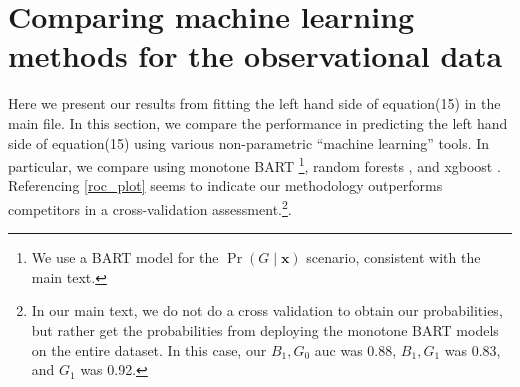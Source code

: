 \documentclass[aoas,preprint, 11pt, dvipsnames, table, x11name]{imsart}
\renewcommand{\bm}[1]{\mathbf{#1}}
\theoremstyle{remark}
\begin{document}
	\newpage
	\section{Comparing machine learning methods for the observational data}\label{machine_append}
	Here we present our results from fitting the left hand side of equation(15) in the main file.
	In this section, we compare the performance in predicting the left hand side of equation(15) using various non-parametric ``machine learning'' tools.  In particular, we compare using monotone BART \footnote{We use a BART \citep{bart} model for the $\Pr(G\mid \bm{x})$ scenario, consistent with the main text.}, random forests \citep{rf}, and xgboost \citep{boost}. Referencing \autoref{roc_plot} seems to indicate our methodology outperforms competitors in a cross-validation assessment.\footnote{In our main text, we do not do a cross validation to obtain our probabilities, but rather get the probabilities from deploying the monotone BART models on the entire dataset.  In this case, our $B_1,G_0$ auc was 0.88, $B_1, G_1$ was 0.83, and $G_1$ was 0.92.}. 
	
	
	
	
	
	
	
\end{document}
